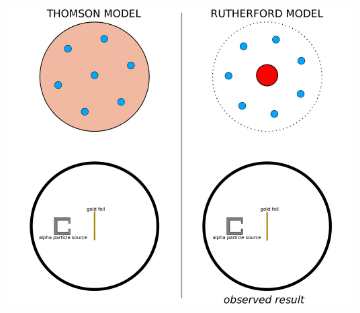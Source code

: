 \documentclass[12pt]{report}
\begin{document}
\begin{figure}[ht]
\begin{subfigure}{.5\textwidth}
			{\includegraphics[width=\linewidth]{assets/atom-model-comparison.png}}
	\end{subfigure}
\end{figure}
\end{document}
